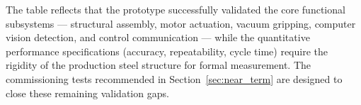 The table reflects that the prototype successfully validated the core functional subsystems --- structural assembly, motor actuation, vacuum gripping, computer vision detection, and control communication --- while the quantitative performance specifications (accuracy, repeatability, cycle time) require the rigidity of the production steel structure for formal measurement. The commissioning tests recommended in Section~\ref{sec:near_term} are designed to close these remaining validation gaps.
